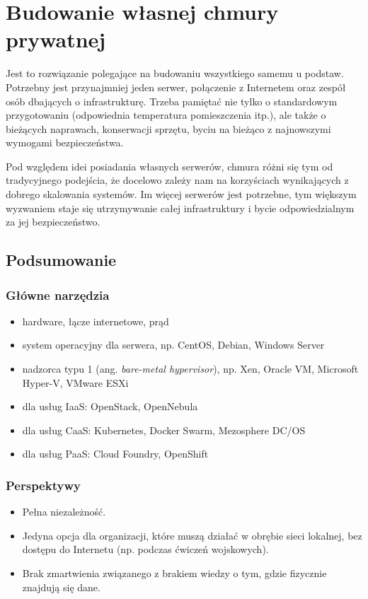 \documentclass[12pt,a4paper,twoside,titlepage,openright]{book}
\begin{document}
\section{Budowanie własnej chmury prywatnej} \label{section:chmuraPrywatna}

Jest to rozwiązanie polegające na budowaniu wszystkiego samemu u podstaw. Potrzebny jest przynajmniej jeden serwer, połączenie z Internetem oraz zespół osób dbających o infrastrukturę. Trzeba pamiętać nie tylko o standardowym przygotowaniu (odpowiednia temperatura pomieszczenia itp.), ale także o bieżących naprawach, konserwacji sprzętu, byciu na bieżąco z najnowszymi wymogami bezpieczeństwa. 

Pod względem idei posiadania własnych serwerów, chmura różni się tym od tradycyjnego podejścia, że docelowo zależy nam na korzyściach wynikających z dobrego skalowania systemów. Im więcej serwerów jest potrzebne, tym większym wyzwaniem staje się utrzymywanie całej infrastruktury i bycie odpowiedzialnym za jej bezpieczeństwo. 

\subsection*{Podsumowanie}

\subsubsection*{Główne narzędzia}
\begin{itemize}
\item hardware, łącze internetowe, prąd
\item system operacyjny dla serwera, np. CentOS, Debian, Windows Server
\item nadzorca typu 1 (ang. \textit{bare-metal hypervisor}), np. Xen, Oracle VM, Microsoft Hyper-V, VMware ESXi
\item dla usług IaaS: OpenStack, OpenNebula
\item dla usług CaaS: Kubernetes, Docker Swarm, Mezosphere DC/OS
\item dla usług PaaS: Cloud Foundry, OpenShift
\end{itemize}

\subsubsection{Perspektywy}
\begin{itemize}
\item Pełna niezależność.
\item Jedyna opcja dla organizacji, które muszą działać w obrębie sieci lokalnej, bez dostępu do Internetu (np. podczas ćwiczeń wojskowych).
\item Brak zmartwienia związanego z brakiem wiedzy o tym, gdzie fizycznie znajdują się dane.
\end{itemize}
\end{document}
